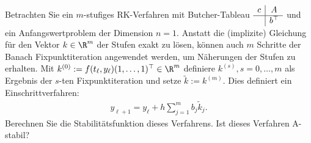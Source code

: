 \begin{exercise}
Betrachten Sie ein $m$-stufiges RK-Verfahren mit Butcher-Tableau
$\begin{array}{c|c}
  c &   A \\ \hline  & b^{\top}
\end{array}$ und ein Anfangswertproblem der Dimension $n = 1$.
Anstatt die (implizite) Gleichung für den Vektor $k \in \R^m$ der Stufen exakt
zu lösen, können auch $m$ Schritte der Banach Fixpunktiteration angewendet werden,
um Näherungen der Stufen zu erhalten. Mit $k^{(0)} := f(t_{\ell},y_{\ell})(1,\dots,1)^{\top} \in \R^m$
definiere $k^{(s)}, s = 0,\dots,m$ als Ergebnis der $s$-ten Fixpunktiteration und setze
$\widetilde{k} := k^{(m)}$. Dies definiert ein Einschrittverfahren:
\begin{align*}
  y_{\ell + 1} = y_{\ell} + h\sum_{j = 1}^m b_j \widetilde{k}_j.
\end{align*}
Berechnen Sie die Stabilitätsfunktion dieses Verfahrens. Ist dieses Verfahren
A-stabil?
\end{exercise}
